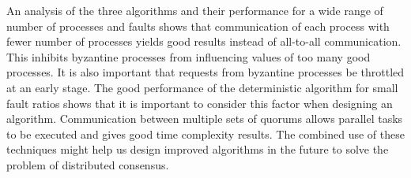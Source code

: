 An analysis of the three algorithms and their performance for a wide range of number of processes and faults shows that communication of each process with fewer number of processes yields good results instead of all-to-all communication. This inhibits byzantine processes from influencing values of too many good processes. It is also important that requests from byzantine processes be throttled at an early stage. The good performance of the deterministic algorithm for small fault ratios shows that it is important to consider this factor when designing an algorithm.  Communication between multiple sets of quorums allows parallel tasks to be executed and gives good time complexity results. The combined use of these techniques might help us design improved algorithms in the future to solve the problem of distributed consensus. 




